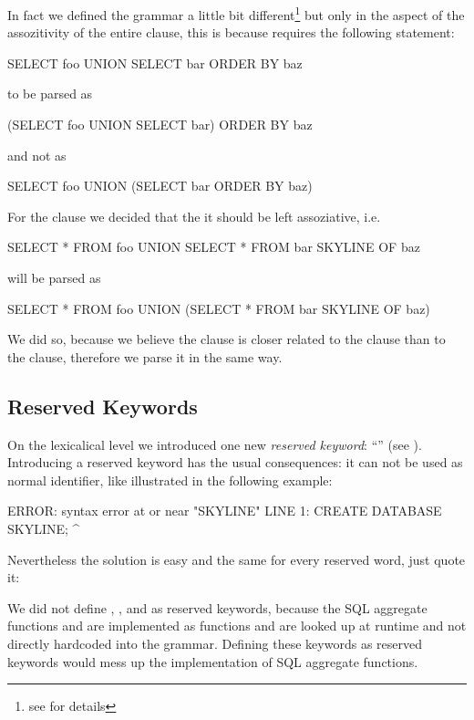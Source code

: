 In fact we defined the grammar a little bit different\footnote{see  for details} but only in the aspect of the assozitivity of the entire  clause, this is because  requires the following statement:
\begin{sql}SELECT foo UNION SELECT bar ORDER BY baz\end{sql}
to be parsed as 
\begin{sql}(SELECT foo UNION SELECT bar) ORDER BY baz\end{sql}
and not as
\begin{sql}SELECT foo UNION (SELECT bar ORDER BY baz)\end{sql}

\noindent{}For the  clause we decided that the it should be left
assoziative, i.e. 
\begin{sql}SELECT * FROM foo UNION SELECT * FROM bar SKYLINE OF baz\end{sql}
will be parsed as 
\begin{sql}SELECT * FROM foo UNION (SELECT * FROM bar SKYLINE OF baz)\end{sql}

\noindent{}We did so, because we believe the  clause is closer
related to the  clause than to the 
clause, therefore we parse it in the same way.

\subsection{Reserved Keywords}
On the lexicalical level we introduced one new \emph{reserved
keyword}: ``'' (see
). Introducing a reserved
keyword has the usual consequences: it can not be used as normal
identifier, like illustrated in the following example:

\begin{interactive}
ERROR:  syntax error at or near "SKYLINE"
LINE 1: CREATE DATABASE SKYLINE;
                        ^
\end{interactive}
\noindent
Nevertheless the solution is easy and the same for every reserved
word, just quote it:
\begin{interactive}
\end{interactive}

We did not define , , and
 as reserved keywords, because the SQL aggregate
functions  and  are implemented as
functions and are looked up at runtime and not directly hardcoded into
the grammar. Defining these keywords as reserved keywords would mess
up the implementation of SQL aggregate functions.


